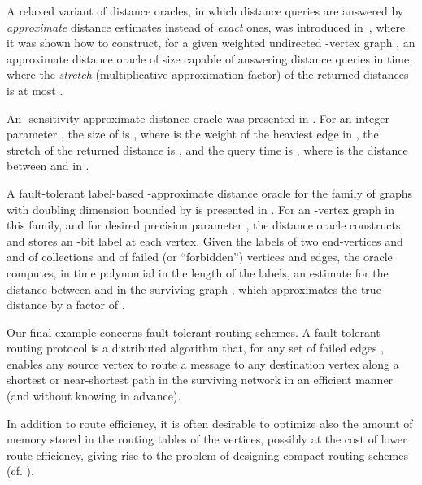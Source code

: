 \documentclass[12pt]{article}
\begin{document}
A relaxed variant of distance oracles, in which distance queries are answered
by {\em approximate} distance estimates instead of {\em exact} ones,
was introduced in~\cite{TZ05}, where it was
shown how to construct, for a given weighted undirected -vertex graph ,
an approximate distance oracle of size 
capable of answering distance queries in  time,
where the {\em stretch} (multiplicative approximation factor)
of the returned distances is at most .
\par
An -sensitivity approximate distance oracle  was presented in
\cite{CLPR09-do}.
For an integer parameter , the size of  is
, where  is the weight of the
heaviest edge in , the stretch of the returned distance is ,
and the query time is ,
where  is the distance between  and  in .
\par
A fault-tolerant label-based -approximate distance oracle
for the family of graphs with doubling dimension bounded by 
is presented in \cite{ACGP10}.
For an -vertex graph  in this family,
and for desired precision parameter ,
the distance oracle constructs and stores
an -bit label at each vertex.
Given the labels of two end-vertices  and  and of collections 
and  of failed (or ``forbidden'') vertices and edges,
the oracle computes, in time polynomial in the length of the labels,
an estimate for the distance between  and  in the surviving graph
, which approximates the true distance
by a factor of .

Our final example concerns fault tolerant routing schemes.
A fault-tolerant routing protocol is a distributed algorithm
that, for any set of failed edges , enables any source vertex 
to route a message to any destination vertex  along a shortest
or near-shortest path in the surviving network 
in an efficient manner (and without knowing  in advance).
\par
In addition to route efficiency, it is often desirable to optimize also
the amount of memory stored in the routing tables of the vertices, possibly
at the cost of lower route efficiency, giving rise to the problem
of designing compact routing schemes
(cf. \cite{ABLP-89:stoc,S12,Peleg00:book,PU-89:tables,TZ01}).
\end{document}
